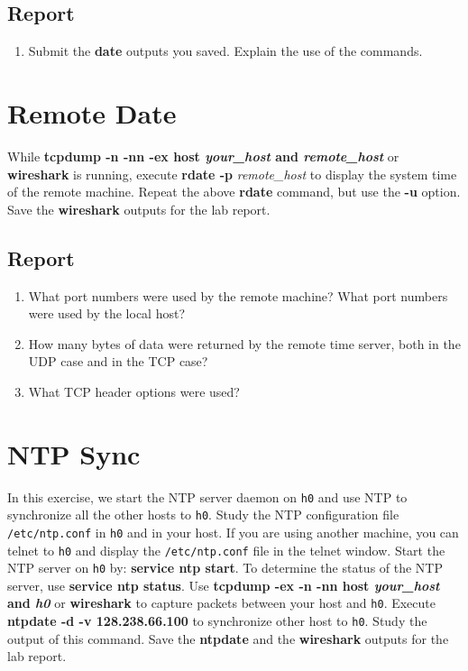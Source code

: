 \documentclass[10pt,a4paper]{article}
\numberwithin{equation}{section}
\numberwithin{figure}{section}
\numberwithin{table}{section}
\begin{document}
    \subsection*{Report}
    \begin{enumerate}
        \item Submit the \textbf{date} outputs you saved.
        Explain the use of the commands.
    \end{enumerate}

\section{Remote Date}
    While \textbf{tcpdump -n -nn -ex host \textit{your\_host} and \textit{remote\_host}} or \textbf{wireshark} is running, execute \textbf{rdate -p} \textit{remote\_host} to display the system time of the remote machine.
    Repeat the above \textbf{rdate} command, but use the \textbf{-u} option.
    Save the \textbf{wireshark} outputs for the lab report.

    \subsection*{Report}
    \begin{enumerate}
        \item What port numbers were used by the remote machine?
        What port numbers were used by the local host?
        \item How many bytes of data were returned by the remote time server, both in the UDP case and in the TCP case?
        \item What TCP header options were used?
    \end{enumerate}

\section{NTP Sync}
    In this exercise, we start the NTP server daemon on \texttt{h0} and use NTP to
    synchronize all the other hosts to \texttt{h0}.
    Study the NTP configuration file \texttt{/etc/ntp.conf} in \texttt{h0} and in your host.
    If you are using another machine, you can telnet to \texttt{h0} and display the \texttt{/etc/ntp.conf} file in the telnet window.
    Start the NTP server on \texttt{h0} by: \textbf{service ntp start}.
    To determine the status of the NTP server, use \textbf{service ntp status}.
    Use \textbf{tcpdump -ex -n -nn host \textit{your\_host} and \textit{h0}} or \textbf{wireshark} to capture packets between your host and \texttt{h0}.
    Execute \textbf{ntpdate -d -v 128.238.66.100} to synchronize other host to \texttt{h0}.
    Study the output of this command.
    Save the \textbf{ntpdate} and the \textbf{wireshark} outputs for the lab report.
\end{document}
